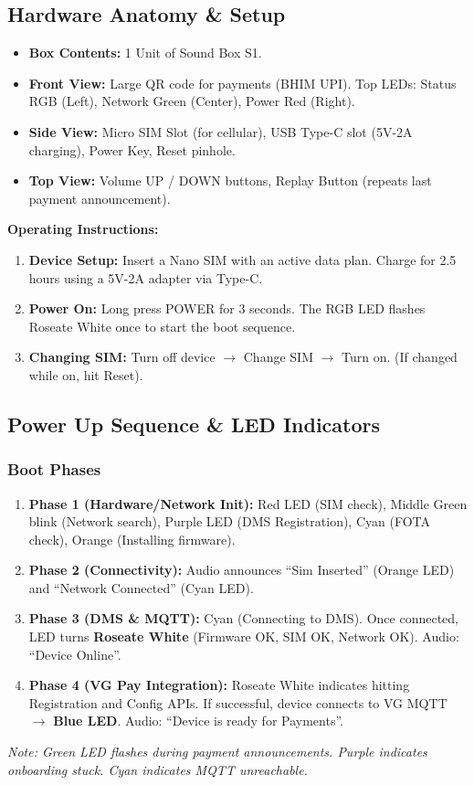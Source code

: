 \documentclass[11pt,a4paper]{article}
\begin{document}
\subsection{Hardware Anatomy \& Setup}
\begin{itemize}
    \item \textbf{Box Contents:} 1 Unit of Sound Box S1.
    \item \textbf{Front View:} Large QR code for payments (BHIM UPI). Top LEDs: Status RGB (Left), Network Green (Center), Power Red (Right).
    \item \textbf{Side View:} Micro SIM Slot (for cellular), USB Type-C slot (5V-2A charging), Power Key, Reset pinhole.
    \item \textbf{Top View:} Volume UP / DOWN buttons, Replay Button (repeats last payment announcement).
\end{itemize}

\textbf{Operating Instructions:}
\begin{enumerate}
    \item \textbf{Device Setup:} Insert a Nano SIM with an active data plan. Charge for 2.5 hours using a 5V-2A adapter via Type-C.
    \item \textbf{Power On:} Long press POWER for 3 seconds. The RGB LED flashes Roseate White once to start the boot sequence.
    \item \textbf{Changing SIM:} Turn off device $\rightarrow$ Change SIM $\rightarrow$ Turn on. (If changed while on, hit Reset).
\end{enumerate}

\subsection{Power Up Sequence \& LED Indicators}

\subsubsection{Boot Phases}
\begin{enumerate}
    \item \textbf{Phase 1 (Hardware/Network Init):} Red LED (SIM check), Middle Green blink (Network search), Purple LED (DMS Registration), Cyan (FOTA check), Orange (Installing firmware).
    \item \textbf{Phase 2 (Connectivity):} Audio announces ``Sim Inserted'' (Orange LED) and ``Network Connected'' (Cyan LED).
    \item \textbf{Phase 3 (DMS \& MQTT):} Cyan (Connecting to DMS). Once connected, LED turns \textbf{Roseate White} (Firmware OK, SIM OK, Network OK). Audio: ``Device Online''.
    \item \textbf{Phase 4 (VG Pay Integration):} Roseate White indicates hitting Registration and Config APIs. If successful, device connects to VG MQTT $\rightarrow$ \textbf{Blue LED}. Audio: ``Device is ready for Payments''.
\end{enumerate}
\textit{Note: Green LED flashes during payment announcements. Purple indicates onboarding stuck. Cyan indicates MQTT unreachable.}
\end{document}
